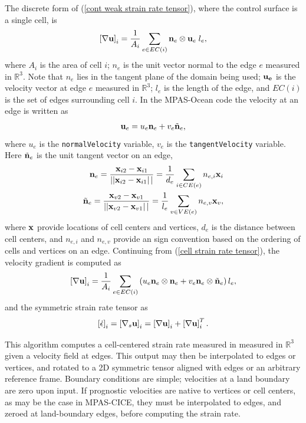\documentclass[11pt]{report}
\begin{document}
The discrete form of (\ref{cont weak strain rate tensor}), where the control surface is a single cell, is
\begin{equation}
\label{cell strain rate tensor}
\left[\nabla {\bf u} \right]_i
= 
\frac{1}{A_i} 
\sum_{e\in EC(i)}{
  {\bf n}_e\otimes{\bf u}_e \; l_e },
\end{equation}
where $A_i$ is the area of cell $i$; $n_e$ is the unit vector normal to the edge $e$ measured in $\mathbb{R}^3$. Note that $n_e$ lies in the  tangent plane of the domain being used; $\bf{u_e}$ is the velocity vector at edge $e$ measured in $\mathbb{R}^3$; $l_e$ is the length of the edge, and $EC(i)$ is the set of edges surrounding cell $i$.  In the MPAS-Ocean code the velocity at an edge is written as 
\begin{eqnarray}
{\bf u}_e = u_e {\bf n}_e + v_e \tilde{\bf n}_e,
\end{eqnarray}
where $u_e$ is the \verb|normalVelocity| variable, $v_e$ is the \verb|tangentVelocity| variable.  Here $\tilde{\bf n}_e$ is the unit tangent vector on an edge,
\begin{eqnarray}
{\bf n}_e = \frac{{\bf x}_{i2}-{\bf x}_{i1}}{\left||{\bf x}_{i2}-{\bf x}_{i1}\right||}
  = \frac{1}{d_e} \sum_{i\in CE(e)}n_{e,i}{\bf x}_{i} 
\\
 \tilde{\bf n}_e = \frac{{\bf x}_{v2}-{\bf x}_{v1}}{\left||{\bf x}_{v2}-{\bf x}_{v1}\right||}
  = \frac{1}{l_e} \sum_{v\in VE(e)}n_{e,v}{\bf x}_{v},
\end{eqnarray}
where ${\bf x}$ provide locations of cell centers and vertices, $d_e$ is the distance between cell centers, and $n_{e,i}$ and $n_{e,v}$ provide an sign convention based on the ordering of cells and vertices on an edge.  Continuing from (\ref{cell strain rate tensor}), the velocity gradient is computed as
\begin{equation}
\label{cell strain rate tensor uv}
\left[\nabla {\bf u} \right]_i
= 
\frac{1}{A_i} 
\sum_{e\in EC(i)}{\left(
  u_e{\bf n}_e\otimes{\bf n}_e 
 +v_e{\bf n}_e\otimes\tilde{\bf n}_e 
\right)l_e },
\end{equation}
and the symmetric strain rate tensor as
\begin{equation}
\label{cell strain rate tensor sym}
\left[\dot\epsilon  \right]_i
= 
\left[\nabla_s {\bf u} \right]_i
= 
\left[\nabla {\bf u} \right]_i
+
\left[\nabla {\bf u} \right]^T_i.
\end{equation}

This algorithm computes a cell-centered strain rate measured in measured in $\mathbb{R}^3$ given a velocity field at edges.  This output may then be interpolated to edges or vertices, and rotated to a 2D symmetric tensor aligned with edges or an arbitrary reference frame.  Boundary conditions are simple; velocities at a land boundary are zero upon input.  If prognostic velocities are native to vertices or cell centers, as may be the case in MPAS-CICE, they must be interpolated to edges, and zeroed at land-boundary edges, before computing the strain rate.
\end{document}

